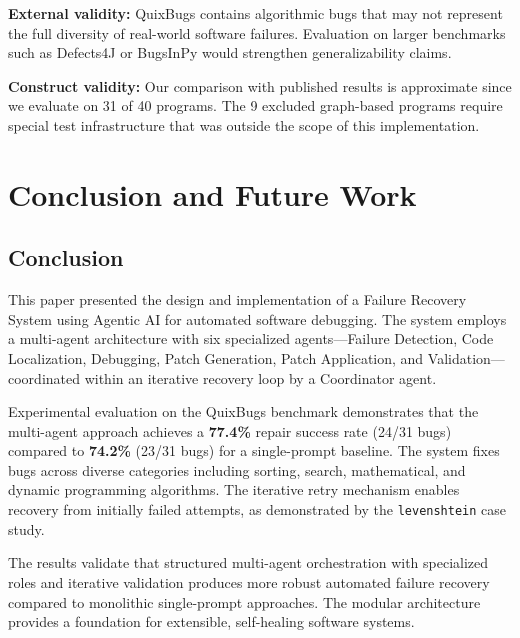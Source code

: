 \documentclass[conference]{IEEEtran}
\begin{document}
\textbf{External validity:} QuixBugs contains algorithmic bugs that may not represent the full diversity of real-world software failures. Evaluation on larger benchmarks such as Defects4J \cite{defects4j} or BugsInPy \cite{bugsinpy} would strengthen generalizability claims.

\textbf{Construct validity:} Our comparison with published results is approximate since we evaluate on 31 of 40 programs. The 9 excluded graph-based programs require special test infrastructure that was outside the scope of this implementation.

\section{Conclusion and Future Work}

\subsection{Conclusion}
This paper presented the design and implementation of a Failure Recovery System using Agentic AI for automated software debugging. The system employs a multi-agent architecture with six specialized agents---Failure Detection, Code Localization, Debugging, Patch Generation, Patch Application, and Validation---coordinated within an iterative recovery loop by a Coordinator agent.

Experimental evaluation on the QuixBugs benchmark demonstrates that the multi-agent approach achieves a \textbf{77.4\%} repair success rate (24/31 bugs) compared to \textbf{74.2\%} (23/31 bugs) for a single-prompt baseline. The system fixes bugs across diverse categories including sorting, search, mathematical, and dynamic programming algorithms. The iterative retry mechanism enables recovery from initially failed attempts, as demonstrated by the \texttt{levenshtein} case study.

The results validate that structured multi-agent orchestration with specialized roles and iterative validation produces more robust automated failure recovery compared to monolithic single-prompt approaches. The modular architecture provides a foundation for extensible, self-healing software systems.
\end{document}
